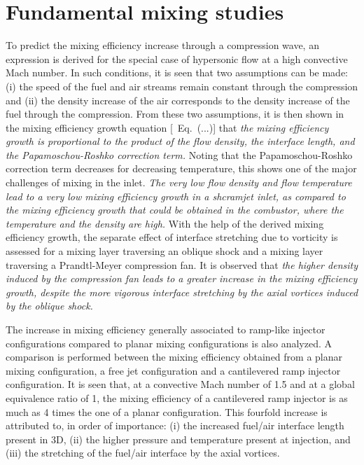 \section{Fundamental mixing studies}

To predict the mixing efficiency increase through a compression wave, an expression
is derived for the special case of hypersonic flow at a high convective Mach number.
In such conditions, it is seen that two assumptions can be made: (i)
the speed of the fuel and air streams
remain constant through the compression and (ii) the density increase of the air
corresponds to the density increase of the fuel through the compression. From these
two assumptions, it is then shown in the mixing efficiency growth
equation [\ie\ Eq.~(...)]
that \emph{the mixing efficiency growth is proportional to the product
of the flow density, the interface length, and the Papamoschou-Roshko correction
term.} Noting that the Papamoschou-Roshko correction term decreases for decreasing
temperature, this shows one of the major challenges of mixing in the inlet.
\emph{The very low flow density and flow temperature
lead to a very low mixing
efficiency growth in a shcramjet inlet, as compared to the mixing efficiency growth
that could be obtained in the combustor, where the temperature and the density are high.}
With the help of the derived mixing efficiency growth,
the separate effect of interface stretching due to vorticity is assessed
for a mixing layer traversing an oblique shock and a mixing layer traversing
a Prandtl-Meyer compression fan. It is observed that \emph{the higher density induced
by the compression fan leads to a greater increase in the mixing efficiency growth,
despite the more vigorous interface stretching by the axial vortices induced
by the oblique shock.}


The increase in mixing efficiency generally associated to ramp-like injector
configurations compared to planar mixing configurations is also analyzed.
A comparison is performed between the mixing efficiency
obtained from a planar mixing configuration, a free jet configuration
and a cantilevered ramp injector configuration.
It is seen that, at a convective Mach number of 1.5 and at a global
equivalence ratio of 1, the mixing efficiency of a cantilevered ramp injector
is as much as 4 times the one of a planar
configuration. This fourfold increase is attributed to, in order of importance:
(i) the increased fuel/air interface length present in 3D, (ii) the higher
pressure and temperature present at injection, and (iii) the stretching of the fuel/air
interface by the axial vortices.


